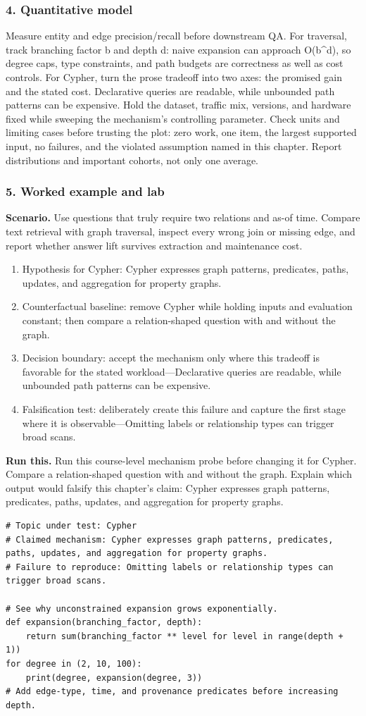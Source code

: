 \subsubsection*{4. Quantitative model}
Measure entity and edge precision/recall before downstream QA. For traversal, track branching factor b and depth d: naive expansion can approach O(b\textasciicircum{}d), so degree caps, type constraints, and path budgets are correctness as well as cost controls.
For Cypher, turn the prose tradeoff into two axes: the promised gain and the stated cost. Declarative queries are readable, while unbounded path patterns can be expensive. Hold the dataset, traffic mix, versions, and hardware fixed while sweeping the mechanism's controlling parameter.
Check units and limiting cases before trusting the plot: zero work, one item, the largest supported input, no failures, and the violated assumption named in this chapter. Report distributions and important cohorts, not only one average.
\subsubsection*{5. Worked example and lab}
\textbf{Scenario.} Use questions that truly require two relations and as-of time. Compare text retrieval with graph traversal, inspect every wrong join or missing edge, and report whether answer lift survives extraction and maintenance cost.
\begin{enumerate}
\item Hypothesis for Cypher: Cypher expresses graph patterns, predicates, paths, updates, and aggregation for property graphs.
\item Counterfactual baseline: remove Cypher while holding inputs and evaluation constant; then compare a relation-shaped question with and without the graph.
\item Decision boundary: accept the mechanism only where this tradeoff is favorable for the stated workload—Declarative queries are readable, while unbounded path patterns can be expensive.
\item Falsification test: deliberately create this failure and capture the first stage where it is observable—Omitting labels or relationship types can trigger broad scans.
\end{enumerate}
\textbf{Run this.} Run this course-level mechanism probe before changing it for Cypher. Compare a relation-shaped question with and without the graph. Explain which output would falsify this chapter's claim: Cypher expresses graph patterns, predicates, paths, updates, and aggregation for property graphs.
\begin{Verbatim}[fontsize=\scriptsize]
# Topic under test: Cypher
# Claimed mechanism: Cypher expresses graph patterns, predicates, paths, updates, and aggregation for property graphs.
# Failure to reproduce: Omitting labels or relationship types can trigger broad scans.

# See why unconstrained expansion grows exponentially.
def expansion(branching_factor, depth):
    return sum(branching_factor ** level for level in range(depth + 1))
for degree in (2, 10, 100):
    print(degree, expansion(degree, 3))
# Add edge-type, time, and provenance predicates before increasing depth.
\end{Verbatim}
